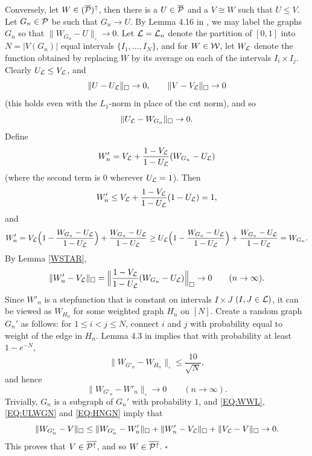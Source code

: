 \documentclass{article}
\newenvironment{proof}{\medskip\noindent{\bf Proof. }}{\hfill$\square$\medskip}
\begin{document}
\begin{proof}
Conversely, let $W\in (\overline{\mathcal{P}})^\uparrow$, then there is a
$U\in\overline{\mathcal{P}}$ and a $V\cong W$ such that $U\le V$. Let
$G_n\in\mathcal{P}$ be such that $G_n\to U$. By Lemma 4.16 in \cite{BCLSV1},
we may label the graphs $G_n$ so that $\|W_{G_n}-U\|_\square\to 0$.
Let $\mathcal{L}=\mathcal{L}_n$ denote the partition of $[0,1]$ into $N=|V(G_n)|$
equal intervals $\{I_1,\dots,I_N\}$, and for $W\in\mathcal{W}$, let $W_{\mathcal{L}}$
denote the function obtained by replacing $W$ by its average on each
of the intervals $I_i\times I_j$. Clearly $U_{\mathcal{L}} \le V_{\mathcal{L}}$, and
\begin{equation}\label{EQ:WWL}
\|U-U_{\mathcal{L}}\|_\square \to 0, \qquad \|V-V_{\mathcal{L}}\|_\square \to 0
\end{equation}
(this holds even with the $L_1$-norm in place of the cut norm), and
so
\begin{equation}\label{EQ:ULWGN}
\|U_{\mathcal{L}}-W_{G_n}\|_\square\to 0.
\end{equation}
Define
\[
W'_n=V_{\mathcal{L}}+\frac{1-V_{\mathcal{L}}}{1-U_{\mathcal{L}}}(W_{G_n}-U_{\mathcal{L}})
\]
(where the second term is $0$ wherever $U_{\mathcal{L}}=1$). Then
\[
W'_n\le V_{\mathcal{L}}+\frac{1-V_{\mathcal{L}}}{1-U_{\mathcal{L}}}(1-U_{\mathcal{L}})=1,
\]
and
\[
W'_n= V_{\mathcal{L}}\Bigl(1-\frac{W_{G_n}-U_{\mathcal{L}}}{1-U_{\mathcal{L}}}\Bigr) +
\frac{W_{G_n}-U_{\mathcal{L}}}{1-U_{\mathcal{L}}} \ge
U_{\mathcal{L}}\Bigl(1-\frac{W_{G_n}-U_{\mathcal{L}}}{1-U_{\mathcal{L}}}\Bigr)+
\frac{W_{G_n}-U_{\mathcal{L}}}{1-U_{\mathcal{L}}} = W_{G_n}.
\]
By Lemma \ref{WSTAR},
\begin{equation}\label{EQ:WNVL}
\|W'_n-V_{\mathcal{L}}\|_\square =
\Bigl\|\frac{1-V_{\mathcal{L}}}{1-U_{\mathcal{L}}}(W_{G_n}-U_{\mathcal{L}})\Bigr\|_\square \to 0
\qquad (n\to\infty).
\end{equation}
Since $W'_n$ is a stepfunction that is constant on intervals $I\times
J$ $(I,J\in\mathcal{L})$, it can be viewed as $W_{H_n}$ for some weighted
graph $H_n$ on $[N]$. Create a random graph $G_n'$ as follows: for
$1\le i < j\le N$, connect $i$ and $j$ with probability equal to
weight of the edge in $H_n$. Lemma 4.3 in \cite{BCLSV1} implies that
with probability at least $1-e^{-N}$,
\[
\|W_{G'_n}-W_{H_n}\|_\square \le \frac{10}{\sqrt{N}},
\]
and hence
\begin{equation}\label{EQ:HNGN}
\|W_{G'_n}-W'_n\|_\square \to 0 \qquad (n\to\infty).
\end{equation}
Trivially, $G_n$ is a subgraph of $G_n'$ with probability $1$, and
\eqref{EQ:WWL}, \eqref{EQ:ULWGN} and \eqref{EQ:HNGN} imply that
\[
\|W_{G'_n}-V\|_\square \le \|W_{G'_n}-W'_n\|_\square +
\|W'_n-V_{\mathcal{L}}\|_\square + \|V_{\mathcal{L}}-V\|_\square \to 0.
\]
This proves that $V\in\overline{\mathcal{P}^\uparrow}$, and so
$W\in\overline{\mathcal{P}^\uparrow}$.
\end{proof}
\end{document}
